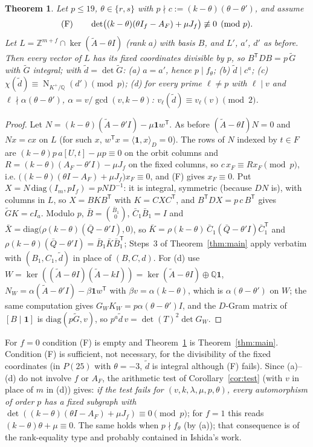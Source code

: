 \documentclass[11pt,a4paper]{article}
\newtheorem{theorem}{Theorem}
\theoremstyle{remark}
\newcommand{\Z}{\mathbb{Z}}
\newcommand{\Q}{\mathbb{Q}}
\newcommand{\one}{\mathbf{1}}
\newcommand{\Nm}{\operatorname{N}}
\begin{document}
\begin{theorem}\label{thm:fix}
Let $p\le19$, $\theta\in\{r,s\}$ with $p\nmid c:=(k-\theta)(\theta-\theta')$, and assume
\[
\textup{(F)}\qquad \det\bigl((k-\theta)(\theta I_f-A_F)+\mu J_f\bigr)\not\equiv0\pmod p .
\]
Let $L=\Z^{m+f}\cap\ker(\tilde A-\theta I)$ (rank $a$) with basis $B$, and $L'$, $a'$, $d'$ as before. Then every vector of $L$ has
its fixed coordinates divisible by $p$, so $B^{\mathsf T}DB=p\,\tilde G$ with $\tilde G$ integral; with $\tilde d=\det\tilde G$:
(a) $a=a'$, hence $p\mid f_\theta$; (b) $\tilde d\mid c^a$; (c) $\chi(\tilde d)\equiv\Nm_{K^+/\Q}(d')\pmod p$; (d) for every prime
$\ell\ne p$ with $\ell\mid v$ and $\ell\nmid\alpha(\theta-\theta')$, $\alpha=v/\gcd(v,k-\theta)$: $v_\ell(\tilde d)\equiv v_\ell(v)\pmod 2$.
\end{theorem}
\begin{proof}
Let $N=(k-\theta)(\tilde A-\theta'I)-\mu\one w^{\mathsf T}$. As before $(\tilde A-\theta I)N=0$ and $Nx=cx$ on $L$ (for such $x$,
$w^{\mathsf T}x=\langle\one,x\rangle_D=0$). The rows of $N$ indexed by $t\in F$ are $(k-\theta)p\,a[U,t]-\mu p\equiv0$ on the orbit
columns and $R=(k-\theta)(A_F-\theta'I)-\mu J_f$ on the fixed columns, so $c\,x_F\equiv Rx_F\pmod p$, i.e.
$\bigl((k-\theta)(\theta I-A_F)+\mu J_f\bigr)x_F\equiv0$, and (F) gives $x_F\equiv0$. Put $X=N\,\mathrm{diag}(I_m,pI_f)=pND^{-1}$:
it is integral, symmetric (because $DN$ is), with columns in $L$, so $X=BKB^{\mathsf T}$ with $K=CXC^{\mathsf T}$, and
$B^{\mathsf T}DX=p\,c\,B^{\mathsf T}$ gives $\tilde GK=cI_a$. Modulo $p$, $\bar B=\binom{\bar B_1}{0}$, $\bar C_1\bar B_1=I$ and
$\bar X=\mathrm{diag}\bigl(\rho(k-\theta)(\bar Q-\theta'I),0\bigr)$, so $\bar K=\rho(k-\theta)\,\bar C_1(\bar Q-\theta'I)\bar C_1^{\mathsf T}$ and
$\rho(k-\theta)(\bar Q-\theta'I)=\bar B_1\bar K\bar B_1^{\mathsf T}$; Steps~3 of Theorem~\ref{thm:main} apply verbatim with $(B_1,C_1,\tilde d)$
in place of $(B,C,d)$. For (d) use $W=\ker((\tilde A-\theta I)(\tilde A-kI))=\ker(\tilde A-\theta I)\oplus\Q\one$,
$N_W=\alpha(\tilde A-\theta'I)-\beta\one w^{\mathsf T}$ with $\beta v=\alpha(k-\theta)$, which is $\alpha(\theta-\theta')$ on $W$; the same
computation gives $G_WK_W=p\alpha(\theta-\theta')I$, and the $D$-Gram matrix of $[B\mid\one]$ is $\mathrm{diag}(p\tilde G,v)$, so
$p^a\tilde d\,v=\det(T)^2\det G_W$.
\end{proof}

For $f=0$ condition (F) is empty and Theorem~\ref{thm:fix} is Theorem~\ref{thm:main}. Condition (F) is sufficient, not
necessary, for the divisibility of the fixed coordinates (in $P(25)$ with $\theta=-3$, $\tilde d$ is integral although (F) fails). Since (a)--(d) do not involve $f$ or $A_F$,
the arithmetic test of Corollary~\ref{cor:test} (with $v$ in place of $m$ in (d)) gives: \emph{if the test fails for $(v,k,\lambda,\mu,p,\theta)$,
every automorphism of order $p$ has a fixed subgraph with $\det((k-\theta)(\theta I-A_F)+\mu J_f)\equiv0\pmod p$}; for $f=1$ this
reads $(k-\theta)\theta+\mu\equiv0$. The same holds when $p\nmid f_\theta$ (by (a)); that consequence is of the rank-equality type
and probably contained in Ishida's work.
\end{document}
